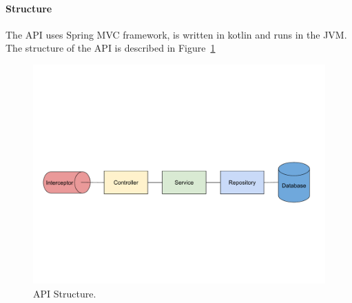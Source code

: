 \paragraph{Structure}

The API uses Spring MVC framework, is written in kotlin and runs in the JVM.
The structure of the API is described in Figure~\ref{fig:Structure}

\begin{figure}[!ht]
	\centering
	\includegraphics[trim={0cm 7cm 0cm 7cm}, width=1\textwidth]{./Chapter4/Figures/API Structure}
	\caption{API Structure.}
	\label{fig:Structure}
\end{figure}

